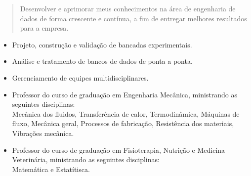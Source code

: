 \documentclass[10pt,a4paper,ragged2e,withhyper]{altacv}
\begin{document}
\begin{paracol}{2}
        
        
        \newpage
        
        \switchcolumn
        
            \begin{quote}
                Desenvolver e aprimorar meus conhecimentos na área de engenharia de dados de forma crescente e contínua, a fim de entregar melhores resultados para a empresa.
            \end{quote}
        
            \begin{itemize}
                \item Projeto, construção e validação de bancadas experimentais.
                \item Análise e tratamento de bancos de dados de ponta a ponta.
                \item Gerenciamento de equipes multidisciplinares.
            \end{itemize}
            
            \divider
            
            \begin{itemize}
                \item Professor do curso de graduação em Engenharia Mecânica, ministrando as seguintes disciplinas: \\ Mecânica dos fluidos, Transferência de calor, Termodinâmica, Máquinas de fluxo, Mecânica geral, Processos de fabricação, Resistência dos materiais, Vibrações mecânica.
                \item Professor do curso de graduação em Fisioterapia, Nutrição e Medicina Veterinária, ministrando as seguintes disciplinas: \\ Matemática e Estatítisca.
            \end{itemize}
            

\end{paracol}
\end{document}
